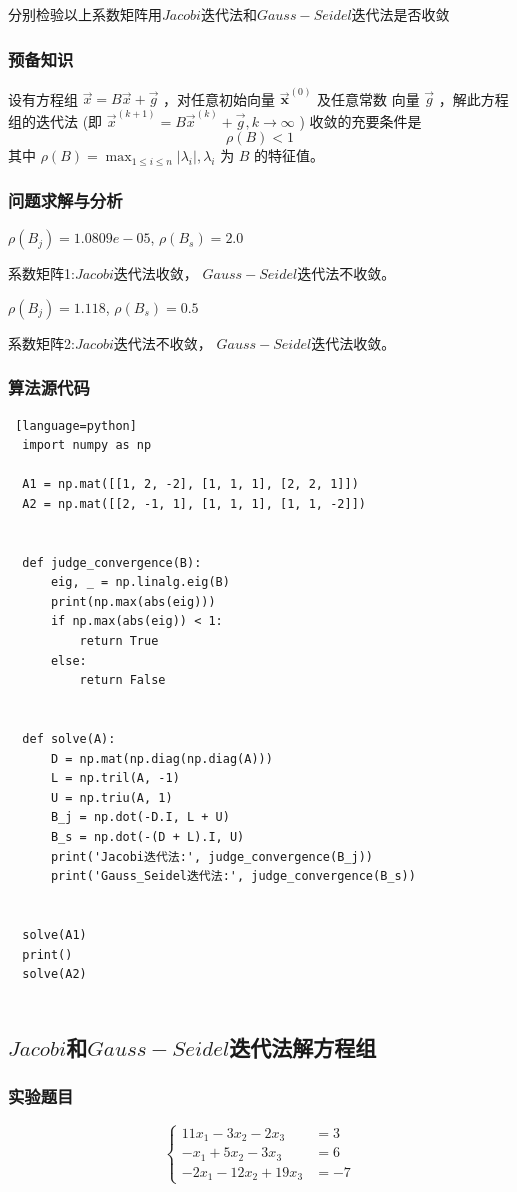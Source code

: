 \documentclass[UTF8]{ctexart}
\begin{document}
分别检验以上系数矩阵用$Jacobi$迭代法和$Gauss-Seidel$迭代法是否收敛
\subsubsection{预备知识}
设有方程组 $\vec{x}=B \vec{x}+\vec{g}$ ，对任意初始向量 $\overrightarrow{\boldsymbol{x}}^{(0)}$ 及任意常数
向量 $\vec{g}$ ，解此方程组的迭代法 
(即 $\vec{x}^{(k+1)}=B \vec{x}^{(k)}+\vec{g}, k \rightarrow \infty$ ) 收敛的充要条件是
$$
\rho(B)<1
$$
其中 $\rho(B)=\max _{1 \leq i \leq n}\left|\lambda_{i}\right| , \lambda_{i}$ 为 $B$ 的特征值。

\subsubsection{问题求解与分析}
$\rho(B_j) = 1.0809e-05$, $\rho(B_s) = 2.0$

系数矩阵1:$Jacobi$迭代法收敛， $Gauss-Seidel$迭代法不收敛。



$\rho(B_j) = 1.118$, $\rho(B_s) = 0.5$

系数矩阵2:$Jacobi$迭代法不收敛， $Gauss-Seidel$迭代法收敛。
\subsubsection{算法源代码}
\begin{lstlisting} [language=python]
  import numpy as np

  A1 = np.mat([[1, 2, -2], [1, 1, 1], [2, 2, 1]])
  A2 = np.mat([[2, -1, 1], [1, 1, 1], [1, 1, -2]])
  
  
  def judge_convergence(B):
      eig, _ = np.linalg.eig(B)
      print(np.max(abs(eig)))
      if np.max(abs(eig)) < 1:
          return True
      else:
          return False
  
  
  def solve(A):
      D = np.mat(np.diag(np.diag(A)))
      L = np.tril(A, -1)
      U = np.triu(A, 1)
      B_j = np.dot(-D.I, L + U)
      B_s = np.dot(-(D + L).I, U)
      print('Jacobi迭代法:', judge_convergence(B_j))
      print('Gauss_Seidel迭代法:', judge_convergence(B_s))
  
  
  solve(A1)
  print()
  solve(A2)
    
\end{lstlisting}
\subsection{$Jacobi$和$Gauss-Seidel$迭代法解方程组}
\subsubsection{实验题目}
\begin{equation}\nonumber
  \left\{\begin{aligned}
      11 x_{1}-3 x_{2}-2 x_{3} &=3 \\
      -x_{1}+5 x_{2}-3 x_{3} &=6 \\
      -2 x_{1}-12 x_{2}+19 x_{3} &=-7
      \end{aligned}\right.
\end{equation}
\end{document}
